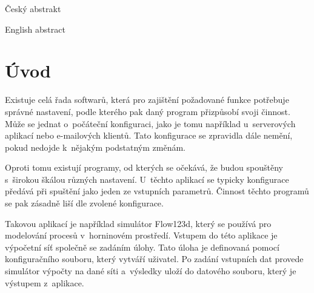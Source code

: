 \documentclass[FM,bw,DP]{tulthesis}
\begin{document}

\begin{abstractCZ}
\thispagestyle{empty}
Český abstrakt
\end{abstractCZ}

\vspace{2cm}
\begin{abstractEN}
English abstract
\end{abstractEN}

\clearpage
\begin{acknowledgement}

\end{acknowledgement}

\renewcommand\contentsname{Obsah\vspace{-30pt}}
\tableofcontents
\clearpage

\listoffigures
\clearpage



\printnoidxglossary[type=\acronymtype,title=Seznam zkratek]



\chapter*{Úvod}

Existuje celá řada softwarů, která pro zajištění požadované funkce potřebuje správné nastavení, podle kterého pak daný program přizpůsobí svoji činnost. Může se jednat o~počáteční konfiguraci, jako je tomu například u~serverových aplikací nebo e-mailových klientů. Tato konfigurace se zpravidla dále nemění, pokud nedojde k~nějakým podstatným změnám.

Oproti tomu existují programy, od kterých se očekává, že budou spouštěny s~širokou škálou různých nastavení. U~těchto aplikací se typicky konfigurace předává při spuštění jako jeden ze vstupních parametrů. Činnost těchto programů se pak zásadně liší dle zvolené konfigurace.

Takovou aplikací je například simulátor Flow123d, který se používá pro modelování procesů v~horninovém prostředí. Vstupem do této aplikace je výpočetní síť společně se zadáním úlohy. Tato úloha je definovaná pomocí konfiguračního souboru, který vytváří uživatel. Po zadání vstupních dat provede simulátor výpočty na dané síti a~výsledky uloží do datového souboru, který je výstupem z~aplikace.
\end{document}
